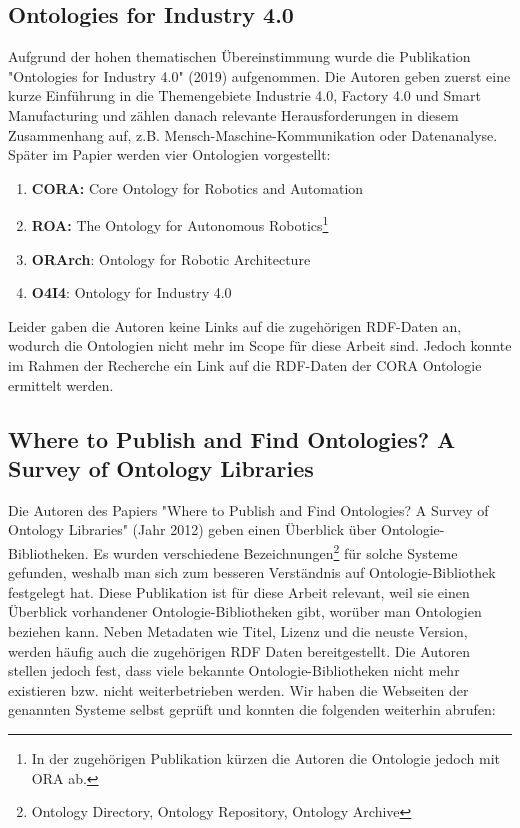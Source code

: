 \documentclass{article}
\begin{document}
\subsection{Ontologies for Industry 4.0}

Aufgrund der hohen thematischen Übereinstimmung wurde die Publikation "Ontologies for Industry 4.0" \cite{kumar2019ontologies} (2019) aufgenommen.
Die Autoren geben zuerst eine kurze Einführung in die Themengebiete Industrie 4.0, Factory 4.0 und Smart Manufacturing und zählen danach relevante Herausforderungen in diesem Zusammenhang auf, z.B. Mensch-Maschine-Kommunikation oder Datenanalyse.
Später im Papier werden vier Ontologien vorgestellt:
\begin{enumerate}
    \item \textbf{CORA:} Core Ontology for Robotics and Automation
    \item \textbf{ROA:} The Ontology for Autonomous Robotics\footnote{In der zugehörigen Publikation\cite{olszewska2017ontology} kürzen die Autoren die Ontologie jedoch mit ORA ab.}
    \item \textbf{ORArch}: Ontology for Robotic Architecture
    \item \textbf{O4I4}: Ontology for Industry 4.0
\end{enumerate}

Leider gaben die Autoren keine Links auf die zugehörigen RDF-Daten an, wodurch die Ontologien nicht mehr im Scope für diese Arbeit sind.
Jedoch konnte im Rahmen der Recherche ein Link auf die RDF-Daten der CORA Ontologie ermittelt werden.

\subsection{Where to Publish and Find Ontologies? A Survey of Ontology Libraries}

Die Autoren des Papiers "Where to Publish and Find Ontologies? A Survey of Ontology Libraries" \cite{d2012publish} (Jahr 2012) geben einen Überblick über Ontologie-Bibliotheken.
Es wurden verschiedene Bezeichnungen\footnote{Ontology Directory, Ontology Repository, Ontology Archive} für solche Systeme gefunden, weshalb man sich zum besseren Verständnis auf Ontologie-Bibliothek festgelegt hat.
Diese Publikation ist für diese Arbeit relevant, weil sie einen Überblick vorhandener Ontologie-Bibliotheken gibt, worüber man Ontologien beziehen kann.
Neben Metadaten wie Titel, Lizenz und die neuste Version, werden häufig auch die zugehörigen RDF Daten bereitgestellt.
Die Autoren stellen jedoch fest, dass viele bekannte Ontologie-Bibliotheken nicht mehr existieren bzw. nicht weiterbetrieben werden.
Wir haben die Webseiten der genannten Systeme selbst geprüft und konnten die folgenden weiterhin abrufen:
\end{document}
